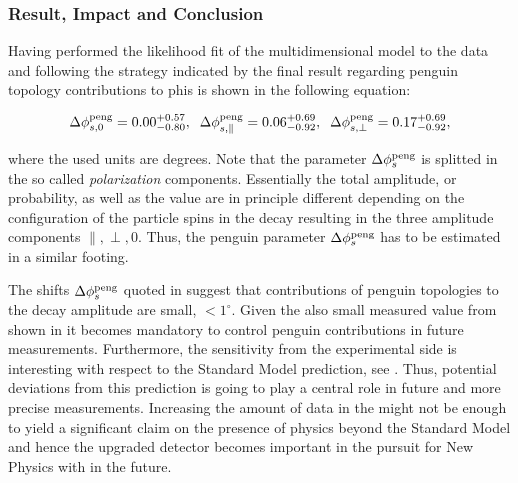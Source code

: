 \subsubsection{Result, Impact and Conclusion}

Having performed the likelihood fit of the multidimensional model to the data and
following the strategy indicated by \cite{Fleischer:1999zi,Faller:2008gt,DeBruyn:2014oga,DeBruyn-thesis}
the final result regarding penguin topology contributions to phis is shown in the following equation:

\begin{equation}
\label{app_delta_phis_result}
  \Delta\phi^{\rm peng}_{s,{0}}         = 0.00 ^{+0.57}_{-0.80}, \;\;
  \Delta\phi^{\rm peng}_{s,{\parallel}} = 0.06 ^{+0.69}_{-0.92}, \;\;
  \Delta\phi^{\rm peng}_{s,{\perp}}     = 0.17 ^{+0.69}_{-0.92},
\end{equation}


\noindent where the used units are degrees. Note that the parameter $\Delta\phi_{s}^{\tiny\text{peng}}$ is splitted in the so called {\it polarization}
components. Essentially the total \BsJpsiPhi amplitude, or probability, as well as the \phis value
are in principle different depending on the configuration of the particle spins in the \BsJpsiPhi
decay resulting in the three amplitude components $\parallel,\perp,0$. Thus, the penguin parameter
$\Delta\phi_{s}^{\tiny\text{peng}}$ has to be estimated in a similar footing.

The shifts $\Delta\phi_{s}^{\tiny\text{peng}}$ quoted in 
suggest that contributions of penguin topologies to the \BsJpsiPhi decay amplitude are
small, $<1^\circ$. Given the also small \phis measured value from \lhcb shown in 
it becomes mandatory to control penguin contributions in future \phis measurements.
Furthermore, the sensitivity from the experimental side is interesting with respect to
the Standard Model prediction, see . Thus, potential deviations from this
prediction is going to play a central role in future and more precise \phis measurements.
Increasing the amount of data in the \lhc \runtwo might not be enough to yield
a significant claim on the presence of physics beyond the Standard Model and hence
the upgraded \lhcb detector becomes important in the pursuit for New Physics with \phis in the future.
